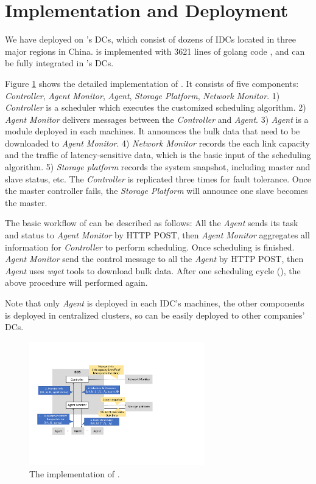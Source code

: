 \section{Implementation and Deployment}
We have deployed \name on \company's DCs, which consist of dozens of IDCs located in three major regions in China. \name is implemented with 3621 lines of golang code \cite{golang}, and can be fully integrated in \company's DCs.

Figure \ref{fig:implementation} shows the detailed implementation of \name. It  consists of five components: \emph{Controller}, \emph{Agent Monitor}, \emph{Agent}, \emph{Storage Platform}, \emph{Network Monitor}. 1) \emph{Controller} is a scheduler which executes the customized scheduling algorithm. 2) \emph{Agent Monitor} delivers messages between the \emph{Controller} and \emph{Agent}. 3) \emph{Agent} is a module deployed in each machines. It announces the bulk data that need to be downloaded to \emph{Agent Monitor}. 4) \emph{Network Monitor} records the each link capacity and the traffic of latency-sensitive data, which is the basic input of the scheduling algorithm. 5) \emph{Storage platform} records the system snapshot, including master and slave status, etc. The \emph{Controller} is replicated three times for fault tolerance. Once the master controller fails, the \emph{Storage Platform} will announce one slave becomes the master.

The basic workflow of \name can be described as follows: All the \emph{Agent} sends its task and status to \emph{Agent Monitor} by HTTP POST, then \emph{Agent Monitor} aggregates all information for \emph{Controller} to perform scheduling. Once scheduling is finished. \emph{Agent Monitor} send the control message to all the \emph{Agent} by HTTP POST, then \emph{Agent} uses \emph{wget} tools to download bulk data. After one scheduling cycle (\fillme), the above procedure will performed again. 

Note that only \emph{Agent} is deployed in each IDC's machines, the other components is deployed in centralized clusters, so \name can be easily deployed to other companies' DCs.
	
\begin{figure}[htbp]
  \centering
  \includegraphics[width=3in]{images/implementation.pdf}
  \caption{The implementation of \name.}
  \label{fig:implementation}
\end{figure}
\vspace{-15pt}

